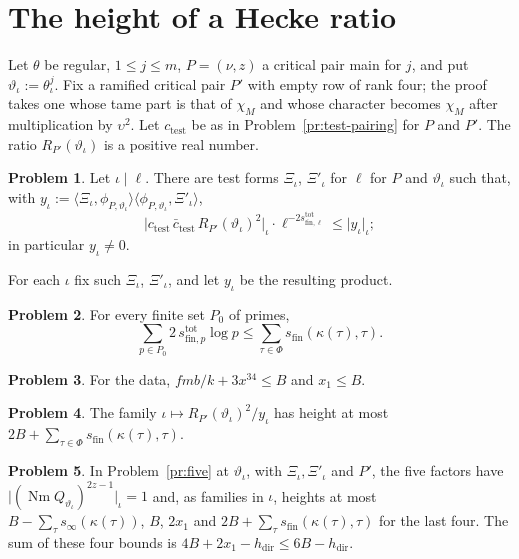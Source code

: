 \documentclass[reqno]{amsart}
\theoremstyle{definition}
\newtheorem{problem}{Problem}[section]
\theoremstyle{plain}
\theoremstyle{remark}
\newcommand{\Nm}{\operatorname{Nm}}
\newcommand{\hdir}{h_{\mathrm{dir}}}
\newcommand{\sfin}{s_{\mathrm{fin}}}
\newcommand{\stot}[1]{s^{\mathrm{tot}}_{\mathrm{fin},#1}}
\newcommand{\ctest}{c_{\mathrm{test}}}
\begin{document}
\section{The height of a Hecke ratio}\label{sec:height}

Let \(\theta\) be regular, \(1 \le j \le m\), \(P = (\nu, z)\) a critical pair main for \(j\), and put \(\vartheta_\iota := \theta_\iota^j\).  Fix a ramified critical pair \(P'\) with empty row of rank four; the proof takes one whose tame part is that of \(\chi_M\) and whose character becomes \(\chi_M\) after multiplication by \(\upsilon^2\).  Let \(\ctest\) be as in Problem~\ref{pr:test-pairing} for \(P\) and \(P'\).  The ratio \(R_{P'}(\vartheta_\iota)\) is a positive real number.

\begin{problem}\label{pr:two-tests}
Let \(\iota \mid \ell\).  There are test forms \(\Xi_\iota\), \(\Xi'_\iota\) for \(\ell\) for \(P\) and \(\vartheta_\iota\) such that, with \(y_\iota := \langle\Xi_\iota, \phi_{P,\vartheta_\iota}\rangle\langle\phi_{P,\vartheta_\iota}, \Xi'_\iota\rangle\),
\[
  \lvert\ctest\,\bar\ctest\,R_{P'}(\vartheta_\iota)^2\rvert_\iota\cdot\ell^{-2\stot\ell} \le \lvert y_\iota\rvert_\iota ;
\]
in particular \(y_\iota \ne 0\).
\end{problem}

For each \(\iota\) fix such \(\Xi_\iota\), \(\Xi'_\iota\), and let \(y_\iota\) be the resulting product.

\begin{problem}\label{pr:prime-sums}
For every finite set \(P_0\) of primes,
\[
  \sum_{p \in P_0} 2\,\stot p\log p \le \sum_{\tau\in\Phi}\sfin(\kappa(\tau), \tau) .
\]
\end{problem}

\begin{problem}\label{pr:sizes}
For the data, \(fmb/k + 3x^{34} \le B\) and \(x_1 \le B\).
\end{problem}

\begin{problem}\label{pr:pairing-height}
The family \(\iota \mapsto R_{P'}(\vartheta_\iota)^2/y_\iota\) has height at most \(2B + \sum_{\tau\in\Phi}\sfin(\kappa(\tau),\tau)\).
\end{problem}

\begin{problem}\label{pr:sum}
In Problem~\ref{pr:five} at \(\vartheta_\iota\), with \(\Xi_\iota, \Xi'_\iota\) and \(P'\), the five factors have \(\lvert(\Nm Q_{\vartheta_\iota})^{2z-1}\rvert_\iota = 1\) and, as families in \(\iota\), heights at most \(B - \sum_\tau s_\infty(\kappa(\tau))\), \(B\), \(2x_1\) and \(2B + \sum_\tau \sfin(\kappa(\tau),\tau)\) for the last four.  The sum of these four bounds is \(4B + 2x_1 - \hdir \le 6B - \hdir\).
\end{problem}
\end{document}
